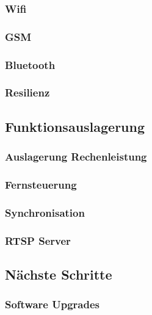 \subsubsection{Wifi}

\subsubsection{GSM}

\subsubsection{Bluetooth}

\subsubsection{Resilienz}


\subsection{Funktionsauslagerung}
\label{subsec:funktionsauslagerung}

\subsubsection{Auslagerung Rechenleistung}

\subsubsection{Fernsteuerung}

\subsubsection{Synchronisation}

\subsubsection{RTSP Server}

\subsection{Nächste Schritte}
\label{subsec:nachste-schritte}

\subsubsection{Software Upgrades}


